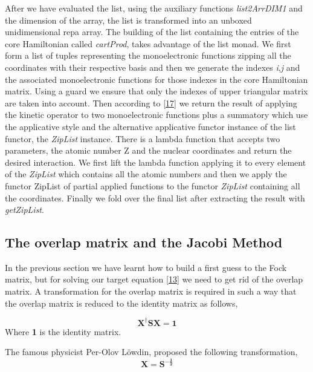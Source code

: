 \documentclass{tmr}
\begin{document}
After we have evaluated the list, using the auxiliary functions \textit{list2ArrDIM1}
and the dimension of the array, the list is transformed into an unboxed unidimensional repa array.
The building of the list containing the entries of the core Hamiltonian called \textit{cartProd},
takes advantage of the list monad. We first form a list of tuples representing the monoelectronic
functions zipping all the coordinates with their respective basis and then we generate the
indexes \textit{i},\textit{j} and the associated monoelectronic functions for those 
indexes in the core Hamiltonian matrix. Using a guard we ensure that only the indexes of
upper triangular matrix are taken into account. Then according to \eqref{17} we return
the result of applying the kinetic operator to two monoelectronic functions plus a summatory
which use the applicative style and the alternative applicative functor instance of the list functor, the
\textit{ZipList} instance. There is a lambda function that accepts two parameters, the atomic number Z and
the nuclear coordinates and return the desired interaction.  We first lift the lambda function applying it
to every element of the \textit{ZipList} which contains all the atomic numbers and then we apply the 
functor ZipList of partial applied functions to the functor \textit{ZipList} 
containing all the coordinates. Finally we fold over the final list after extracting
the result with \textit{getZipList}.

\subsection{The overlap matrix and the Jacobi Method}

In the previous section we have learnt how to build a first guess to the Fock matrix,
but for solving our target equation \eqref{13} we need to get rid of the overlap matrix.
A transformation for the overlap matrix is required in such a way that the overlap matrix
is reduced to the identity matrix as follows,

\begin{equation}\label{17}
 \mathbf{X^{\dagger}SX} = \mathbf{1}
\end{equation}
Where \textbf{1} is the identity matrix. 

\par The famous physicist Per-Olov L\"owdin, proposed the following transformation,
\begin{equation}\label{18}
\mathbf{X} = \mathbf{S^{-\frac{1}{2}}} 
\end{equation}
\end{document}
